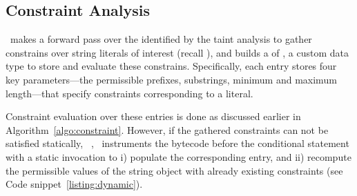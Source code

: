 
\subsection{Constraint Analysis}
\label{subsec:constraint analysis}

\tool\ makes a forward pass over the  identified by the taint
analysis to gather constrains over string literals of interest (recall
), and builds a  of , a
custom data type to store and evaluate these constrains. Specifically, each
 entry stores four key parameters---the permissible
prefixes, substrings, minimum and maximum length---that specify constraints
corresponding to a  literal.

Constraint evaluation over these  entries is done as
discussed earlier in Algorithm~\ref{algo:constraint}. However, if the gathered
constraints can not be satisfied statically, \eg\
, \tool\ instruments the bytecode before the
conditional statement with a static invocation to i) populate the corresponding
\code{ConstraintDataType} entry, and ii) recompute the permissible values of the
string object with already existing constraints (see Code
snippet~\ref{listing:dynamic}).



